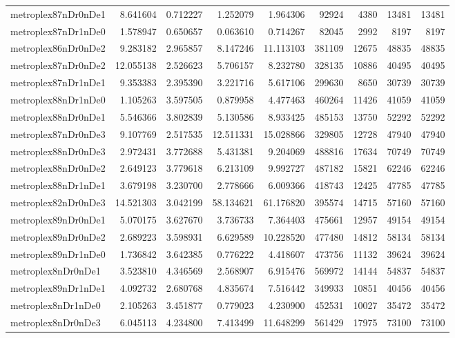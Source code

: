 \documentclass[../../../thesis.tex]{subfiles}
\begin{document}
\begin{longtable}{|l|r|r|r|r|r|r|r|r|}
metroplex87nDr0nDe1 & 8.641604 & 0.712227 & 1.252079 & 1.964306 & 92924 & 4380 & 13481 & 13481 \\
metroplex87nDr1nDe0 & 1.578947 & 0.650657 & 0.063610 & 0.714267 & 82045 & 2992 & 8197 & 8197 \\
metroplex86nDr0nDe2 & 9.283182 & 2.965857 & 8.147246 & 11.113103 & 381109 & 12675 & 48835 & 48835 \\
metroplex87nDr0nDe2 & 12.055138 & 2.526623 & 5.706157 & 8.232780 & 328135 & 10886 & 40495 & 40495 \\
metroplex87nDr1nDe1 & 9.353383 & 2.395390 & 3.221716 & 5.617106 & 299630 & 8650 & 30739 & 30739 \\
metroplex88nDr1nDe0 & 1.105263 & 3.597505 & 0.879958 & 4.477463 & 460264 & 11426 & 41059 & 41059 \\
metroplex88nDr0nDe1 & 5.546366 & 3.802839 & 5.130586 & 8.933425 & 485153 & 13750 & 52292 & 52292 \\
metroplex87nDr0nDe3 & 9.107769 & 2.517535 & 12.511331 & 15.028866 & 329805 & 12728 & 47940 & 47940 \\
metroplex88nDr0nDe3 & 2.972431 & 3.772688 & 5.431381 & 9.204069 & 488816 & 17634 & 70749 & 70749 \\
metroplex88nDr0nDe2 & 2.649123 & 3.779618 & 6.213109 & 9.992727 & 487182 & 15821 & 62246 & 62246 \\
metroplex88nDr1nDe1 & 3.679198 & 3.230700 & 2.778666 & 6.009366 & 418743 & 12425 & 47785 & 47785 \\
metroplex82nDr0nDe3 & 14.521303 & 3.042199 & 58.134621 & 61.176820 & 395574 & 14715 & 57160 & 57160 \\
metroplex89nDr0nDe1 & 5.070175 & 3.627670 & 3.736733 & 7.364403 & 475661 & 12957 & 49154 & 49154 \\
metroplex89nDr0nDe2 & 2.689223 & 3.598931 & 6.629589 & 10.228520 & 477480 & 14812 & 58134 & 58134 \\
metroplex89nDr1nDe0 & 1.736842 & 3.642385 & 0.776222 & 4.418607 & 473756 & 11132 & 39624 & 39624 \\
metroplex8nDr0nDe1 & 3.523810 & 4.346569 & 2.568907 & 6.915476 & 569972 & 14144 & 54837 & 54837 \\
metroplex89nDr1nDe1 & 4.092732 & 2.680768 & 4.835674 & 7.516442 & 349933 & 10851 & 40456 & 40456 \\
metroplex8nDr1nDe0 & 2.105263 & 3.451877 & 0.779023 & 4.230900 & 452531 & 10027 & 35472 & 35472 \\
metroplex8nDr0nDe3 & 6.045113 & 4.234800 & 7.413499 & 11.648299 & 561429 & 17975 & 73100 & 73100 \\

\end{longtable}
\end{document}
